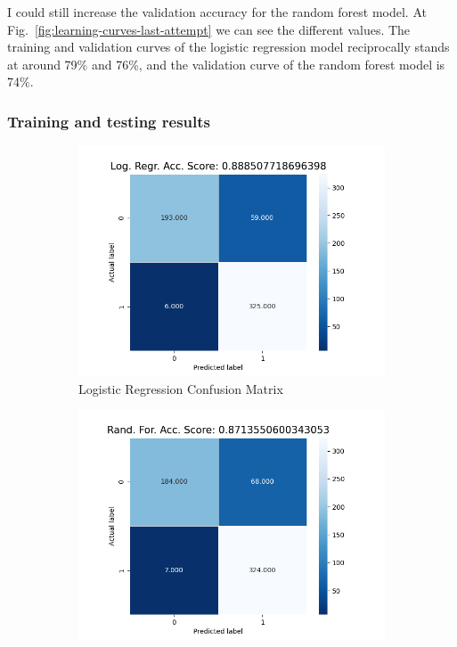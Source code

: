 \documentclass[12pt, conference]{IEEEtran}
\begin{document}
I could still increase the validation accuracy for the random forest model. At Fig.~\ref{fig:learning-curves-last-attempt} we can see the different values. The training and validation curves of the logistic regression model reciprocally stands at around 79\% and 76\%, and the validation curve of the random forest model is 74\%.

\subsubsection{Training and testing results}

\begin{figure}[t]
    \centering
    \begin{subfigure}[b]{.5\linewidth}
        \centering
        \includegraphics[width=\linewidth]{resources/confusion_matrix_in-out_features_bitrate_logreg.png}
        \caption{Logistic Regression Confusion Matrix}
        \label{fig:confusion-matrix-last-attempt-randfor}
    \end{subfigure}%
    \begin{subfigure}[b]{.5\linewidth}
        \centering
        \includegraphics[width=\linewidth]{resources/confusion_matrix_in-out_features_bitrate_randfor.png}

\end{subfigure}
\end{figure}
\end{document}
